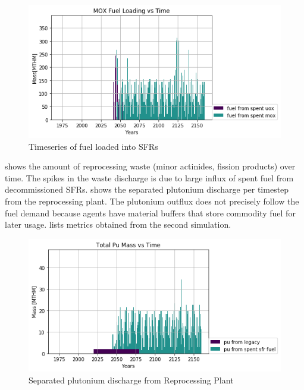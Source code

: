 \begin{figure}[htbp!]
	\begin{center}
		\includegraphics[scale=0.7]{./images/french-transition/where_fuel.png}
	\end{center}
	\caption{Timeseries of fuel loaded into \glspl{SFR}}
	\label{fig:fuel}
\end{figure}

 shows the amount of reprocessing waste
(minor actinides, fission products) over time. The spikes in the 
waste discharge is due to large influx of spent fuel from
decommissioned \glspl{SFR}. shows the separated plutonium discharge
per timestep from the reprocessing plant. The plutonium outflux
does not precisely follow the fuel demand because \Cyclus agents have
material buffers that store commodity fuel for later usage. 
 lists metrics obtained from the second simulation.

\begin{figure}[htbp!]
	\begin{center}
		\includegraphics[scale=0.7]{./images/french-transition/pu.png}
	\end{center}
	\caption{Separated plutonium discharge from Reprocessing Plant}
	\label{fig:pu_no_cum}
\end{figure}


